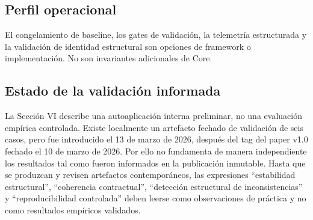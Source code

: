 \documentclass[conference]{IEEEtran}
\begin{document}
\subsection*{Perfil operacional}
El congelamiento de baseline, los gates de validación, la telemetría estructurada y la validación de identidad estructural son opciones de framework o implementación. No son invariantes adicionales de Core.

\subsection*{Estado de la validación informada}
La Sección VI describe una autoaplicación interna preliminar, no una evaluación empírica controlada. Existe localmente un artefacto fechado de validación de seis casos, pero fue introducido el 13 de marzo de 2026, después del tag del paper v1.0 fechado el 10 de marzo de 2026. Por ello no fundamenta de manera independiente los resultados tal como fueron informados en la publicación inmutable. Hasta que se produzcan y revisen artefactos contemporáneos, las expresiones ``estabilidad estructural'', ``coherencia contractual'', ``detección estructural de inconsistencias'' y ``reproducibilidad controlada'' deben leerse como observaciones de práctica y no como resultados empíricos validados.
\end{document}
